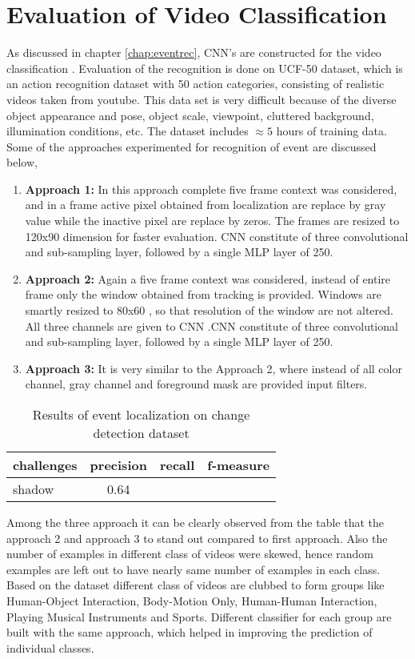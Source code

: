 \section{Evaluation of Video Classification} 
As discussed in chapter \ref{chap:eventrec}, CNN's are constructed for the video classification . Evaluation of the recognition is done on UCF-50 dataset, which is an action recognition dataset with 50 action categories, consisting of realistic videos taken from youtube. This data set is very difficult because of the diverse object appearance and pose, object scale, viewpoint, cluttered background, illumination conditions, etc. The dataset includes $\approx{5}$ hours of training data. Some of the approaches experimented for recognition of event are discussed below,
\begin{enumerate}
	\item{\textbf{Approach 1:} In this approach complete five frame context was considered, and in a frame active pixel obtained from localization are replace by gray value while the inactive pixel are replace by zeros. The frames are resized to 120x90 dimension for faster evaluation. CNN constitute of three convolutional and sub-sampling layer,  followed by a single MLP layer of 250.}
	\item{\textbf{Approach 2:} Again a five frame context was considered, instead of entire frame only the window obtained from tracking is provided.  Windows are smartly resized to 80x60 , so that resolution of the window are not altered. All three channels are given to CNN .CNN constitute of three convolutional and sub-sampling layer,  followed by a single MLP layer of 250.}
	\item{\textbf{Approach 3:} It is very similar to the Approach 2, where instead of all color channel, gray channel and foreground mask are provided input filters.}	
\end{enumerate}
\begin{table}[htbp]
   \caption{Results of event localization on change detection dataset}
   \begin{center}
   \begin{tabular}{|l|c|c|c|} \hline
        challenges & precision & recall & f-measure \\ \hline
		shadow & 0.64 & & \\ \hline
   \end{tabular}
   \label{tab:salTwoObj}
   \end{center}
 \end{table} 
Among the three approach it can be clearly observed from the table that the approach 2 and approach 3 to stand out compared to first approach. Also the number of examples in different class of videos were skewed, hence random examples are left out to have nearly same number of examples in each class. Based on the dataset different class of videos are clubbed to form groups like Human-Object Interaction, Body-Motion Only, Human-Human Interaction, Playing Musical Instruments and Sports. Different classifier for each group are built with the same approach, which helped in improving the prediction of individual classes. 
